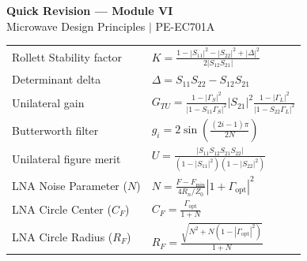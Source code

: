 \documentclass[12pt,a4paper]{article}
\renewcommand{\arraystretch}{1.45}
\begin{document}
\begin{center}
  {\large\bfseries\color{myred} Quick Revision --- Module VI}\\[3pt]
  {\small\color{mydark} Microwave Design Principles $|$ PE-EC701A}
\end{center}
\noindent{\color{myred}\rule{\linewidth}{1.2pt}}
\vspace{4pt}

\begin{tcolorbox}[formulabox, title={\textbf{Key Formulas at a Glance}}]
\renewcommand{\arraystretch}{1.3}
\begin{tabularx}{\linewidth}{B{4.5cm} X}Rollett Stability factor & $K = \frac{1 - |S_{11}|^2 - |S_{22}|^2 + |\Delta|^2}{2|S_{12}S_{21}|}$ \\[4pt]
Determinant delta       & $\Delta = S_{11}S_{22} - S_{12}S_{21}$ \\[4pt]
Unilateral gain         & $G_{TU} = \frac{1-|\Gamma_S|^2}{|1-S_{11}\Gamma_S|^2} |S_{21}|^2 \frac{1-|\Gamma_L|^2}{|1-S_{22}\Gamma_L|^2}$ \\[4pt]
Butterworth filter      & $g_i = 2 \sin\left(\frac{(2i-1)\pi}{2N}\right)$ \\[4pt]
Unilateral figure merit  & $U = \frac{|S_{11}S_{12}S_{21}S_{22}|}{(1-|S_{11}|^2)(1-|S_{22}|^2)}$ \\[4pt]
LNA Noise Parameter ($N$) & $N = \frac{F - F_{\text{min}}}{4 R_n/Z_0} |1 + \Gamma_{\text{opt}}|^2$ \\[4pt]
LNA Circle Center ($C_F$) & $C_F = \frac{\Gamma_{\text{opt}}}{1 + N}$ \\[4pt]
LNA Circle Radius ($R_F$) & $R_F = \frac{\sqrt{N^2 + N(1 - |\Gamma_{\text{opt}}|^2)}}{1 + N}$
\end{tabularx}
\end{tcolorbox}
\end{document}

